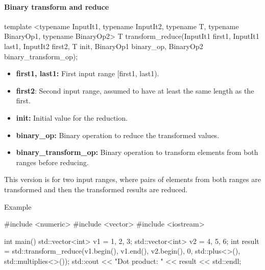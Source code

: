 \documentclass{report}
\begin{document}
   \paragraph{Binary transform and reduce}
   \bigbreak \noindent \bigbreak \noindent 
   \begin{cppcode}
    template <typename InputIt1, typename InputIt2, typename T, typename BinaryOp1, typename BinaryOp2>
    T transform_reduce(InputIt1 first1, InputIt1 last1, InputIt2 first2, T init, BinaryOp1 binary_op, BinaryOp2 binary_transform_op);
   \end{cppcode}
   \begin{itemize}
       \item \textbf{first1, last1:} First input range [first1, last1).
       \item \textbf{first2}: Second input range, assumed to have at least the same length as the first.
       \item \textbf{init:} Initial value for the reduction.
       \item \textbf{binary\_op:} Binary operation to reduce the transformed values.
       \item \textbf{binary\_transform\_op:} Binary operation to transform elements from both ranges before reducing.
   \end{itemize}
   \bigbreak \noindent 
   This version is for two input ranges, where pairs of elements from both ranges are transformed and then the transformed results are reduced.

   \bigbreak \noindent 
   Example
   \bigbreak \noindent 
   \begin{cppcode}
       #include <numeric>
       #include <vector>
       #include <iostream>

       int main() {
           std::vector<int> v1 = {1, 2, 3};
           std::vector<int> v2 = {4, 5, 6};
           int result = std::transform_reduce(v1.begin(), v1.end(), v2.begin(), 0, std::plus<>(), std::multiplies<>());
           std::cout << "Dot product: " << result << std::endl;
       }
   \end{cppcode}

   \pagebreak \bigbreak \noindent 
\end{document}

